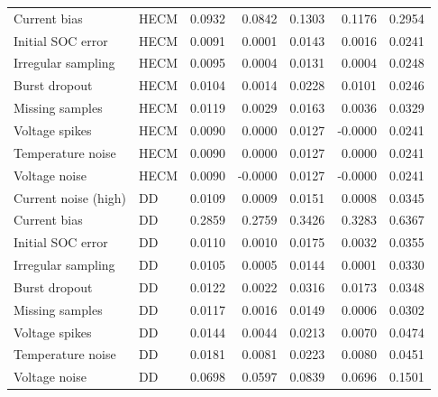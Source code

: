 \documentclass[review,nopreprintline]{elsarticle}
\begin{document}
\begin{longtable}{llrrrrr}
Current bias & HECM & 0.0932 & 0.0842 & 0.1303 & 0.1176 & 0.2954 \\
Initial SOC error & HECM & 0.0091 & 0.0001 & 0.0143 & 0.0016 & 0.0241 \\
Irregular sampling & HECM & 0.0095 & 0.0004 & 0.0131 & 0.0004 & 0.0248 \\
Burst dropout & HECM & 0.0104 & 0.0014 & 0.0228 & 0.0101 & 0.0246 \\
Missing samples & HECM & 0.0119 & 0.0029 & 0.0163 & 0.0036 & 0.0329 \\
Voltage spikes & HECM & 0.0090 & 0.0000 & 0.0127 & -0.0000 & 0.0241 \\
Temperature noise & HECM & 0.0090 & 0.0000 & 0.0127 & 0.0000 & 0.0241 \\
Voltage noise & HECM & 0.0090 & -0.0000 & 0.0127 & -0.0000 & 0.0241 \\
Current noise (high) & DD & 0.0109 & 0.0009 & 0.0151 & 0.0008 & 0.0345 \\
Current bias & DD & 0.2859 & 0.2759 & 0.3426 & 0.3283 & 0.6367 \\
Initial SOC error & DD & 0.0110 & 0.0010 & 0.0175 & 0.0032 & 0.0355 \\
Irregular sampling & DD & 0.0105 & 0.0005 & 0.0144 & 0.0001 & 0.0330 \\
Burst dropout & DD & 0.0122 & 0.0022 & 0.0316 & 0.0173 & 0.0348 \\
Missing samples & DD & 0.0117 & 0.0016 & 0.0149 & 0.0006 & 0.0302 \\
Voltage spikes & DD & 0.0144 & 0.0044 & 0.0213 & 0.0070 & 0.0474 \\
Temperature noise & DD & 0.0181 & 0.0081 & 0.0223 & 0.0080 & 0.0451 \\
Voltage noise & DD & 0.0698 & 0.0597 & 0.0839 & 0.0696 & 0.1501 \\
\bottomrule
\end{longtable}
\end{document}
